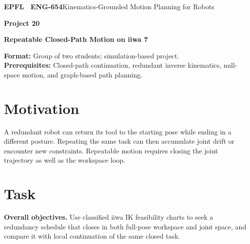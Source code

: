 \documentclass[11pt,a4paper]{article}
\begin{document}
{\small\textbf{EPFL \textbar\ ENG-654}\hfill Kinematics-Grounded Motion Planning for Robots}
\vspace{5mm}

{\color{epflred}\Large\bfseries Project 20}

{\LARGE\bfseries Repeatable Closed-Path Motion on iiwa 7\par}

\textbf{Format:} Group of two students; simulation-based project.\\
\textbf{Prerequisites:} Closed-path continuation, redundant inverse kinematics, null-space motion, and graph-based path planning.

\section*{Motivation}
A redundant robot can return its tool to the starting pose while
ending in a different posture. Repeating the same task can then accumulate
joint drift or encounter new constraints. Repeatable motion requires
closing the joint trajectory as well as the workspace loop.

\section*{Task}
\textbf{Overall objectives.} Use classified iiwa IK feasibility charts to seek a redundancy
schedule that closes in both full-pose workspace and joint space, and
compare it with local continuation of the same closed task.
\end{document}
